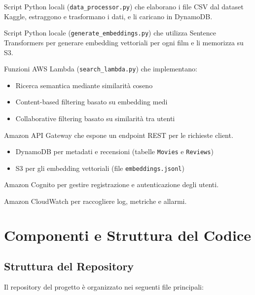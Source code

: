 \documentclass[11pt,a4paper]{article}
\begin{document}
\begin{description}[style=nextline, leftmargin=0cm, itemsep=0.5em]
  \item[Data Ingestion] Script Python locali (\texttt{data\_processor.py}) che elaborano i file CSV dal dataset Kaggle, estraggono e trasformano i dati, e li caricano in DynamoDB.
  
  \item[Embedding Generation] Script Python locale (\texttt{generate\_embeddings.py}) che utilizza Sentence Transformers per generare embedding vettoriali per ogni film e li memorizza su S3.
  
  \item[Backend Serverless] Funzioni AWS Lambda (\texttt{search\_lambda.py}) che implementano:
    \begin{itemize}
      \item Ricerca semantica mediante similarità coseno
      \item Content-based filtering basato su embedding medi
      \item Collaborative filtering basato su similarità tra utenti
    \end{itemize}
    
  \item[API Layer] Amazon API Gateway che espone un endpoint REST per le richieste client.
  
  \item[Storage] 
    \begin{itemize}
      \item DynamoDB per metadati e recensioni (tabelle \texttt{Movies} e \texttt{Reviews})
      \item S3 per gli embedding vettoriali (file \texttt{embeddings.jsonl})
    \end{itemize}
    
  \item[Autenticazione] Amazon Cognito per gestire registrazione e autenticazione degli utenti.
  
  \item[Monitoring] Amazon CloudWatch per raccogliere log, metriche e allarmi.
\end{description}

\section{Componenti e Struttura del Codice}
\subsection{Struttura del Repository}
Il repository del progetto è organizzato nei seguenti file principali:
\end{document}
